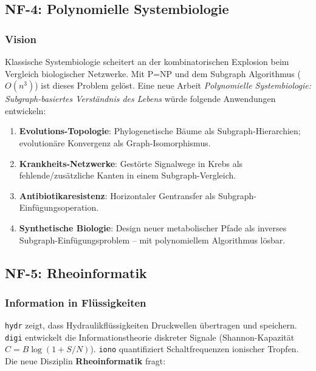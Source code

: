﻿\documentclass[a4paper,12pt]{scrreprt}
\theoremstyle{definition}
\begin{document}
\subsection{NF-4: Polynomielle Systembiologie}

\subsubsection{Vision}

Klassische Systembiologie scheitert an der kombinatorischen Explosion beim
Vergleich biologischer Netzwerke. Mit P=NP und dem Subgraph Algorithmus
($O(n^3)$) ist dieses Problem gelöst. Eine neue Arbeit \emph{Polynomielle
Systembiologie: Subgraph-basiertes Verständnis des Lebens} würde folgende
Anwendungen entwickeln:

\begin{enumerate}
  \item \textbf{Evolutions-Topologie}: Phylogenetische Bäume als Subgraph-Hierarchien;
    evolutionäre Konvergenz als Graph-Isomorphismus.
  \item \textbf{Krankheits-Netzwerke}: Gestörte Signalwege in Krebs als
    fehlende/zusätzliche Kanten in einem Subgraph-Vergleich.
  \item \textbf{Antibiotikaresistenz}: Horizontaler Gentransfer als
    Subgraph-Einfügungsoperation.
  \item \textbf{Synthetische Biologie}: Design neuer metabolischer Pfade
    als inverses Subgraph-Einfügungsproblem -- mit polynomiellem Algorithmus lösbar.
\end{enumerate}

\subsection{NF-5: Rheoinformatik}

\subsubsection{Information in Flüssigkeiten}

\texttt{hydr} zeigt, dass Hydraulikflüssigkeiten Druckwellen übertragen
und speichern. \texttt{digi} entwickelt die Informationstheorie diskreter
Signale (Shannon-Kapazität $C = B \log(1 + S/N)$). \texttt{iono} quantifiziert
Schaltfrequenzen ionischer Tropfen. Die neue Disziplin
\textbf{Rheoinformatik} fragt:
\end{document}
